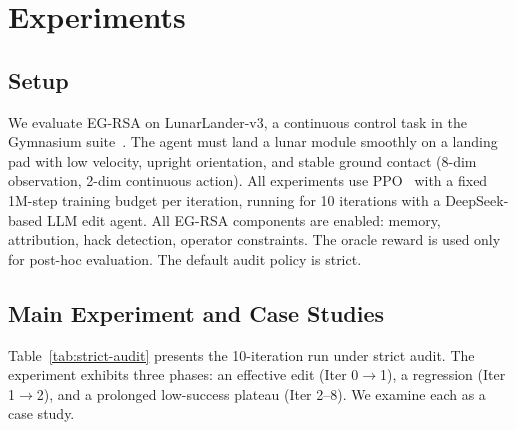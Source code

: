\documentclass[11pt]{article}
\begin{document}
\section{Experiments}
\label{sec:experiments}

\subsection{Setup}

We evaluate EG-RSA on LunarLander-v3, a continuous control task in the Gymnasium suite~\citep{towers2024gymnasium}. The agent must land a lunar module smoothly on a landing pad with low velocity, upright orientation, and stable ground contact (8-dim observation, 2-dim continuous action). All experiments use PPO~\citep{schulman2017ppo} with a fixed 1M-step training budget per iteration, running for 10 iterations with a DeepSeek-based LLM edit agent. All EG-RSA components are enabled: memory, attribution, hack detection, operator constraints. The oracle reward is used only for post-hoc evaluation. The default audit policy is strict.

\subsection{Main Experiment and Case Studies}

Table~\ref{tab:strict-audit} presents the 10-iteration run under strict audit. The experiment exhibits three phases: an effective edit (Iter 0$\to$1), a regression (Iter 1$\to$2), and a prolonged low-success plateau (Iter 2--8). We examine each as a case study.
\end{document}
